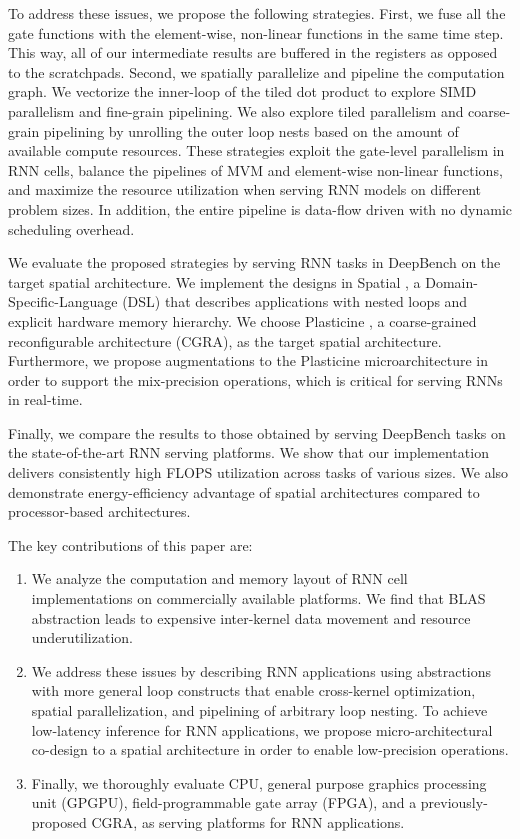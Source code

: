 To address these issues, we propose the following strategies.
First, we fuse all the gate functions with the element-wise, non-linear functions in the same time step.
This way, all of our intermediate results are buffered in the registers as opposed to the
scratchpads.
Second, we spatially parallelize and pipeline the computation graph.
We vectorize the inner-loop of the tiled dot product to explore SIMD parallelism and fine-grain pipelining.
We also explore tiled parallelism and coarse-grain pipelining by unrolling the outer loop nests
based on the amount of available compute resources.
These strategies exploit the gate-level parallelism in RNN cells, balance the pipelines of
MVM and element-wise non-linear functions, and maximize the resource utilization when serving
RNN models on different problem sizes. In addition, the entire pipeline is data-flow
driven with no dynamic scheduling overhead.

We evaluate the proposed strategies by serving RNN tasks in DeepBench \cite{deepbench}
  on the target spatial architecture.
We implement the designs in Spatial \cite{spatial_koeplinger},
  a Domain-Specific-Language (DSL) that describes
  applications with nested loops and explicit
  hardware memory hierarchy.
We choose Plasticine \cite{plasticine},
  a coarse-grained reconfigurable architecture (CGRA),
  as the target spatial architecture.
Furthermore, we propose augmentations to the Plasticine microarchitecture
  in order to support the mix-precision operations,
  which is critical for serving RNNs in real-time.

Finally, we compare the results to those obtained by serving DeepBench tasks on the
  state-of-the-art RNN serving platforms.
We show that our implementation delivers consistently high FLOPS utilization across
tasks of various sizes.
We also demonstrate energy-efficiency advantage of
spatial architectures compared to processor-based architectures.

The key contributions of this paper are:
\begin{enumerate}
\item
  We analyze the computation and memory layout of
  RNN cell implementations on commercially available platforms.
  We find that BLAS abstraction leads to
  expensive inter-kernel data movement and resource underutilization.
\item
  We address these issues by describing RNN applications using
  abstractions with more general loop constructs that enable 
  cross-kernel optimization, spatial parallelization, and pipelining
  of arbitrary loop nesting.
  To achieve low-latency inference for RNN applications,
  we propose micro-architectural co-design to a spatial architecture in order
  to enable low-precision operations.
\item
  Finally, we thoroughly evaluate CPU,
    general purpose graphics processing unit (GPGPU),
    field-programmable gate array (FPGA), and a previously-proposed CGRA,
    as serving platforms for RNN applications.
\end{enumerate}

